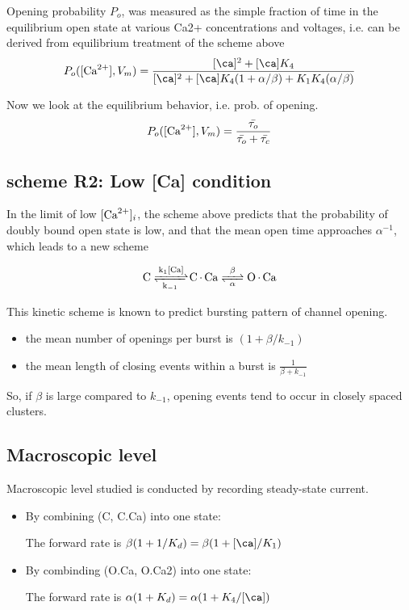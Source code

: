 Opening probability $P_o$, was measured as the simple fraction of time in the
equilibrium open state at various Ca2+ concentrations and voltages, i.e. can be
derived from equilibrium treatment of the scheme above
\begin{equation}
P_o ([\Ca],V_m) = \frac{[\ca]^2 + [\ca] K_4}{[\ca]^2 + [\ca]K_4
(1+\alpha/\beta) + K_1 K_4 (\alpha/\beta)}
\end{equation}


Now we look at the equilibrium behavior, i.e. prob. of opening.
\begin{equation}
P_o ([{\text{Ca}^{2+}}], V_m) = \frac{\bar{\tau_o}}{\bar{\tau_o} + \bar{\tau_c}}
\end{equation}


\subsection{scheme R2: Low [Ca] condition}

In the limit of low $[{\text{Ca}^{2+}}]_i$, the scheme above predicts that the probability of
doubly bound open state is low, and that the mean open time approaches
$\alpha^{-1}$, which leads to a new scheme

\begin{equation}
\ce{ C <=>[k_1\text{[Ca]}][k_{-1}] C.Ca <=>[\beta][\alpha] O.Ca}
\end{equation}

This kinetic scheme is known to predict bursting pattern of channel opening. 
\begin{itemize}
  \item the mean number of openings per burst is $(1+ \beta/k_{-1})$
  
  \item the mean length of closing events within a burst is 
  $\frac{1}{\beta +k_{-1}}$
\end{itemize}
So, if $\beta$ is large compared to $k_{-1}$, opening events tend to occur in
closely spaced clusters.

\subsection{Macroscopic level}

Macroscopic level studied is conducted by recording steady-state current.
\begin{itemize}
  \item By combining (C, C.Ca) into one state:
  
The forward rate is $\beta (1 + 1/K_d) = \beta(1 + [\ca]/K_1)$
  
  \item By combinding (O.Ca, O.Ca2) into one state:
  
The forward rate is $\alpha (1 + K_d) = \alpha(1 + K_4/[\ca])$
  
\end{itemize}

